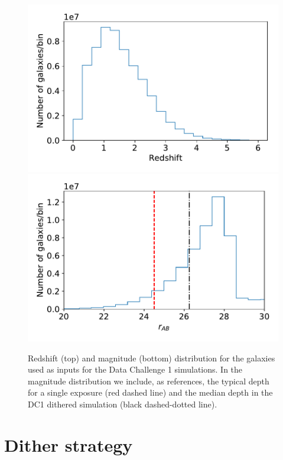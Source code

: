 \documentclass[twocolumn]{aastex62}
\begin{document}
\begin{figure}
\centering
\includegraphics[width=0.9\columnwidth]{N_z_DC1.pdf}
\includegraphics[width=0.9\columnwidth]{N_m_DC1.pdf}
\caption{Redshift (top) and magnitude (bottom) distribution for the galaxies used as inputs for the Data Challenge 1 simulations. In the magnitude distribution we include, as references, the typical depth for a single exposure (red dashed line) and the median depth in the DC1 dithered simulation (black dashed-dotted line).}
\label{fig:catalog_plots}
\end{figure}

\section{Dither strategy}
\label{sec:dithering}
\end{document}

